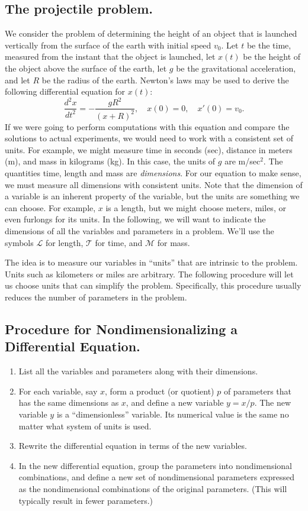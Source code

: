 \subsection*{The projectile problem.}
We consider the problem of determining the height of an object that is
launched vertically from the surface of the earth with initial speed $v_0$.
Let $t$ be the time, measured from the instant that the
object is launched, let $x(t)$ be the height of the object above
the surface of the earth, let $g$ be the gravitational acceleration,
and let $R$ be the radius of the earth.
Newton's laws may be used to derive the following differential equation
for $x(t)$:
\begin{equation}
   \frac{d^2x}{dt^2} = -\frac{gR^2}{(x+R)^2}, \quad x(0)=0, \quad x'(0)=v_0.
   \label{eqn:projectile}
\end{equation}
If we were going to perform computations with this equation and compare
the solutions to actual experiments, we would need to work with
a consistent set of units.  For example, we might measure time in
seconds (sec), distance in meters (m), and mass in kilograms (kg).
In this case, the units of $g$ are  m/sec$^2$.
The quantities time, length and mass are \emph{dimensions}.
For our equation to make sense, we must measure all dimensions
with consistent units.  Note that the dimension of a variable
is an inherent property of the variable, but the units are something
we can choose. For example, $x$ is a length, but we might
choose meters, miles, or even furlongs for its units.
In the following, we will want to indicate the dimensions
of all the variables and parameters in a problem.
We'll use the symbols $\mathcal{L}$ for length,
$\mathcal{T}$ for time, and $\mathcal{M}$ for mass.

The idea is to measure our variables in ``units''
that are intrinsic to the problem.  Units such as kilometers
or miles are arbitrary. The following procedure
will let us choose units that can simplify the problem.
Specifically, this procedure usually reduces the number
of parameters in the problem.

\subsection*{Procedure for Nondimensionalizing a Differential Equation.}
\begin{enumerate}
\item List all the variables and parameters along with
their dimensions.
\item For each variable, say $x$, form a product
(or quotient) $p$ of parameters that has the same
dimensions as $x$, and define a new variable
$y = x/p$. The new variable $y$ is a ``dimensionless'' variable.
Its numerical value is the same no matter what
system of units is used.
\item Rewrite the differential equation in terms
of the new variables.
\item In the new differential equation, group the parameters
into nondimensional combinations, and define a new set of
nondimensional parameters expressed as the nondimensional
combinations of the original parameters.
(This will typically result in fewer parameters.)
\end{enumerate}

